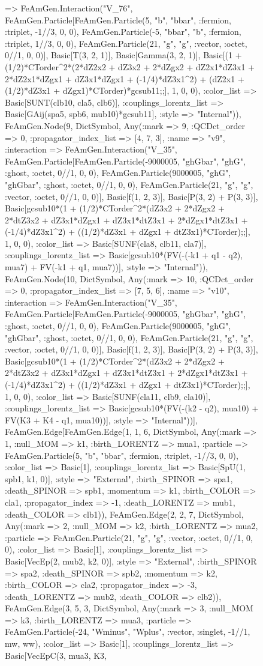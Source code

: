 \documentclass{revtex4}
\begin{document}
\begin{figure}[!htb]
\begin{center}
{=> FeAmGen.Interaction("V_76", FeAmGen.Particle[FeAmGen.Particle(5, "b", "bbar", :fermion, :triplet, -1//3, 0, 0), FeAmGen.Particle(-5, "bbar", "b", :fermion, :triplet, 1//3, 0, 0), FeAmGen.Particle(21, "g", "g", :vector, :octet, 0//1, 0, 0)], Basic[T(3, 2, 1)], Basic[Gamma(3, 2, 1)], Basic[(1 + (1/2)*CTorder^2*(2*dZ2x2 + dZ3x2 + 2*dZgx2 + dZ2x1*dZ3x1 + 2*dZ2x1*dZgx1 + dZ3x1*dZgx1 + (-1/4)*dZ3x1^2) + (dZ2x1 + (1/2)*dZ3x1 + dZgx1)*CTorder)*gcsub11;;], 1, 0, 0), :color_list => Basic[SUNT(clb10, cla5, clb6)], :couplings_lorentz_list => Basic[GAij(spa5, spb6, mub10)*gcsub11], :style => "Internal")), FeAmGen.Node(9, Dict{Symbol, Any}(:mark => 9, :QCDct_order => 0, :propagator_index_list => [4, 7, 3], :name => "v9", :interaction => FeAmGen.Interaction("V_35", FeAmGen.Particle[FeAmGen.Particle(-9000005, "ghGbar", "ghG", :ghost, :octet, 0//1, 0, 0), FeAmGen.Particle(9000005, "ghG", "ghGbar", :ghost, :octet, 0//1, 0, 0), FeAmGen.Particle(21, "g", "g", :vector, :octet, 0//1, 0, 0)], Basic[f(1, 2, 3)], Basic[P(3, 2) + P(3, 3)], Basic[gcsub10*(1 + (1/2)*CTorder^2*(dZ3x2 + 2*dZgx2 + 2*dtZ3x2 + dZ3x1*dZgx1 + dZ3x1*dtZ3x1 + 2*dZgx1*dtZ3x1 + (-1/4)*dZ3x1^2) + ((1/2)*dZ3x1 + dZgx1 + dtZ3x1)*CTorder);;], 1, 0, 0), :color_list => Basic[SUNF(cla8, clb11, cla7)], :couplings_lorentz_list => Basic[gcsub10*(FV(-(-k1 + q1 - q2), mua7) + FV(-k1 + q1, mua7))], :style => "Internal")), FeAmGen.Node(10, Dict{Symbol, Any}(:mark => 10, :QCDct_order => 0, :propagator_index_list => [7, 5, 6], :name => "v10", :interaction => FeAmGen.Interaction("V_35", FeAmGen.Particle[FeAmGen.Particle(-9000005, "ghGbar", "ghG", :ghost, :octet, 0//1, 0, 0), FeAmGen.Particle(9000005, "ghG", "ghGbar", :ghost, :octet, 0//1, 0, 0), FeAmGen.Particle(21, "g", "g", :vector, :octet, 0//1, 0, 0)], Basic[f(1, 2, 3)], Basic[P(3, 2) + P(3, 3)], Basic[gcsub10*(1 + (1/2)*CTorder^2*(dZ3x2 + 2*dZgx2 + 2*dtZ3x2 + dZ3x1*dZgx1 + dZ3x1*dtZ3x1 + 2*dZgx1*dtZ3x1 + (-1/4)*dZ3x1^2) + ((1/2)*dZ3x1 + dZgx1 + dtZ3x1)*CTorder);;], 1, 0, 0), :color_list => Basic[SUNF(cla11, clb9, cla10)], :couplings_lorentz_list => Basic[gcsub10*(FV(-(k2 - q2), mua10) + FV(K3 + K4 - q1, mua10))], :style => "Internal"))], FeAmGen.Edge[FeAmGen.Edge(1, 1, 6, Dict{Symbol, Any}(:mark => 1, :null_MOM => k1, :birth_LORENTZ => mua1, :particle => FeAmGen.Particle(5, "b", "bbar", :fermion, :triplet, -1//3, 0, 0), :color_list => Basic[1], :couplings_lorentz_list => Basic[SpU(1, spb1, k1, 0)], :style => "External", :birth_SPINOR => spa1, :death_SPINOR => spb1, :momentum => k1, :birth_COLOR => cla1, :propagator_index => -1, :death_LORENTZ => mub1, :death_COLOR => clb1)), FeAmGen.Edge(2, 2, 7, Dict{Symbol, Any}(:mark => 2, :null_MOM => k2, :birth_LORENTZ => mua2, :particle => FeAmGen.Particle(21, "g", "g", :vector, :octet, 0//1, 0, 0), :color_list => Basic[1], :couplings_lorentz_list => Basic[VecEp(2, mub2, k2, 0)], :style => "External", :birth_SPINOR => spa2, :death_SPINOR => spb2, :momentum => k2, :birth_COLOR => cla2, :propagator_index => -3, :death_LORENTZ => mub2, :death_COLOR => clb2)), FeAmGen.Edge(3, 5, 3, Dict{Symbol, Any}(:mark => 3, :null_MOM => k3, :birth_LORENTZ => mua3, :particle => FeAmGen.Particle(-24, "Wminus", "Wplus", :vector, :singlet, -1//1, mw, ww), :color_list => Basic[1], :couplings_lorentz_list => Basic[VecEpC(3, mua3, K3, }
\end{center}
\end{figure}
\end{document}
